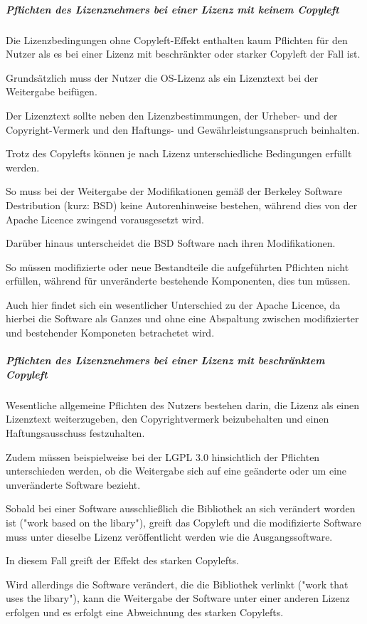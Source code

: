 \subparagraph{Pflichten des Lizenznehmers bei einer Lizenz mit keinem Copyleft}
Die Lizenzbedingungen ohne Copyleft-Effekt enthalten kaum Pflichten für den Nutzer als es bei einer Lizenz mit beschränkter oder starker Copyleft der Fall ist.

Grundsätzlich muss der Nutzer die OS-Lizenz als ein Lizenztext bei der Weitergabe beifügen. 

Der Lizenztext sollte neben den Lizenzbestimmungen, der Urheber- und der Copyright-Vermerk und den Haftungs- und Gewährleistungsanspruch beinhalten. 

Trotz des Copylefts können je nach Lizenz unterschiedliche Bedingungen erfüllt werden.

So muss bei der Weitergabe der Modifikationen gemäß der Berkeley Software Destribution (kurz: BSD) keine Autorenhinweise bestehen, während dies von der Apache Licence zwingend vorausgesetzt wird.

Darüber hinaus unterscheidet die BSD Software nach ihren Modifikationen. 

So müssen modifizierte oder neue Bestandteile die aufgeführten Pflichten nicht erfüllen, während für unveränderte bestehende Komponenten, dies tun müssen. 

Auch hier findet sich ein wesentlicher Unterschied zu der Apache Licence, da hierbei die Software als Ganzes und ohne eine Abspaltung zwischen modifizierter und bestehender Komponeten betrachetet wird. 

\subparagraph{Pflichten des Lizenznehmers bei einer Lizenz mit beschränktem Copyleft}
Wesentliche allgemeine Pflichten des Nutzers bestehen darin, die Lizenz als einen Lizenztext weiterzugeben, den Copyrightvermerk beizubehalten und einen Haftungsausschuss festzuhalten. 

Zudem müssen beispielweise bei der LGPL 3.0 hinsichtlich der Pflichten unterschieden werden, ob die Weitergabe sich auf eine geänderte oder um eine unveränderte Software bezieht.

Sobald bei einer Software ausschließlich die Bibliothek an sich verändert worden ist ("work based on the libary"), greift das Copyleft und die modifizierte Software muss unter dieselbe Lizenz veröffentlicht werden wie die Ausgangssoftware. 

In diesem Fall greift der Effekt des starken Copylefts. 

Wird allerdings die Software verändert, die die Bibliothek verlinkt ("work that uses the libary"), kann die Weitergabe der Software unter einer anderen Lizenz erfolgen und es erfolgt eine Abweichnung des starken Copylefts.  

